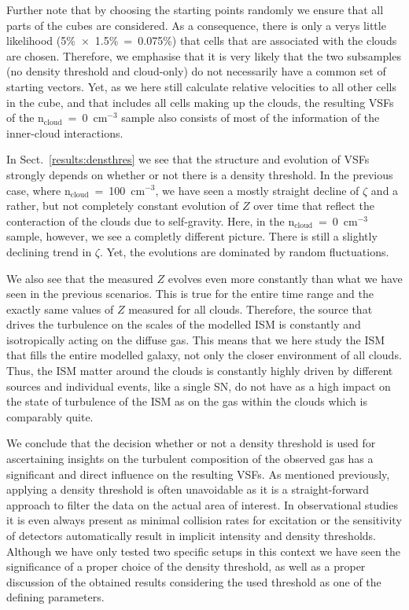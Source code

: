 Further note that by choosing the starting points randomly we ensure that all parts of the cubes are considered. 
As a consequence, there is only a verys little likelihood (5\%~$\times$~1.5\%~=~0.075\%) that cells that are associated with the clouds are chosen.
Therefore, we emphasise that it is very likely that the two subsamples (no density threshold and cloud-only) do not necessarily have a common set of starting vectors.
Yet, as we here still calculate relative velocities to all other cells in the cube, and that includes all cells making up the clouds, the resulting VSFs of the n$_\mathrm{cloud}$~=~0~cm$^{-3}$ sample also consists of most of the information of the inner-cloud interactions.

In Sect.~\ref{results:densthres} we see that the structure and evolution of VSFs strongly depends on whether or not there is a density threshold. 
In the previous case, where n$_\mathrm{cloud}$~=~100~cm$^{-3}$, we have seen a mostly straight decline of $\zeta$ and a rather, but not completely constant evolution of $Z$ over time that reflect the conteraction of the clouds due to self-gravity.
Here, in the n$_\mathrm{cloud}$~=~0~cm$^{-3}$ sample, however, we see a completly different picture.
There is still a slightly declining trend in $\zeta$.
Yet, the evolutions are dominated by random fluctuations.

We also see that the measured $Z$ evolves even more constantly than what we have seen in the previous scenarios. 
This is true for the entire time range and the exactly same values of $Z$ measured for all clouds.
Therefore, the source that drives the turbulence on the scales of the modelled ISM is constantly and isotropically acting on the diffuse gas.
This means that we here study the ISM that fills the entire modelled galaxy, not only the closer environment of all clouds.
Thus, the ISM matter around the clouds is constantly highly driven by different sources and individual events, like a single SN, do not have as a high impact on the state of turbulence of the ISM as on the gas within the clouds which is comparably quite.

We conclude that the decision whether or not a density threshold is used for ascertaining insights on the turbulent composition of the observed gas has a significant and direct influence on the resulting VSFs.
As mentioned previously, applying a density threshold is often unavoidable as it is a straight-forward approach to filter the data on the actual area of interest.
In observational studies it is even always present as minimal collision rates for excitation or the sensitivity of detectors automatically result in implicit intensity and density thresholds. 
Although we have only tested two specific setups in this context we have seen the significance of a proper choice of the density threshold, as well as a proper discussion of the obtained results considering the used threshold as one of the defining parameters.

